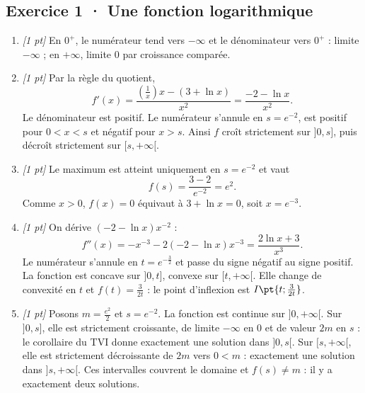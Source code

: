 \subsection*{Exercice 1 · Une fonction logarithmique}\begin{enumerate}

\item \textit{[1 pt]} En $0^+$, le numérateur tend vers $-\infty$ et le dénominateur vers $0^+$ : limite $-\infty$ ; en $+\infty$, limite $0$ par croissance comparée.

\item \textit{[1 pt]} Par la règle du quotient,
\[f'(x)=\frac{(\frac{1}{x})x-(3+\ln x)}{x^2}=\frac{-2-\ln x}{x^2}.\]
Le dénominateur est positif. Le numérateur s'annule en $s=e^{-2}$, est positif pour $0<x<s$ et négatif pour $x>s$. Ainsi $f$ croît strictement sur $]0,s]$, puis décroît strictement sur $[s,+\infty[$.

\item \textit{[1 pt]} Le maximum est atteint uniquement en $s=e^{-2}$ et vaut
\[f(s)=\frac{3- 2}{e^{-2}}=e^{2}.\]
Comme $x>0$, $f(x)=0$ équivaut à $3+\ln x=0$, soit $x=e^{-3}$.

\item \textit{[1 pt]} On dérive $(-2-\ln x)x^{-2}$ :
\[f''(x)=-x^{-3}-2(-2-\ln x)x^{-3}=\frac{2\ln x+3}{x^3}.\]
Le numérateur s'annule en $t=e^{-\frac{3}{2}}$ et passe du signe négatif au signe positif. La fonction est concave sur $]0,t]$, convexe sur $[t,+\infty[$. Elle change de convexité en $t$ et $f(t)=\frac{3}{2t}$ : le point d'inflexion est $I\pt{t;\frac{3}{2t}}$.

\item \textit{[1 pt]} Posons $m=\frac{e^{2}}{2}$ et $s=e^{-2}$. La fonction est continue sur $]0,+\infty[$. Sur $]0,s]$, elle est strictement croissante, de limite $-\infty$ en $0$ et de valeur $2m$ en $s$ : le corollaire du TVI donne exactement une solution dans $]0,s[$. Sur $[s,+\infty[$, elle est strictement décroissante de $2m$ vers $0<m$ : exactement une solution dans $]s,+\infty[$. Ces intervalles couvrent le domaine et $f(s)\ne m$ : il y a exactement deux solutions.

\end{enumerate}

